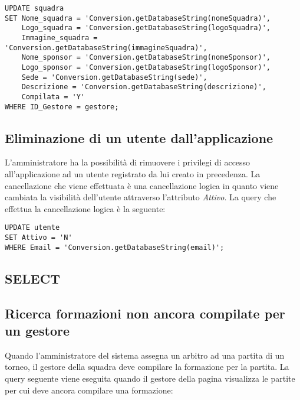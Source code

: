 \begin{lstlisting}
UPDATE squadra
SET Nome_squadra = 'Conversion.getDatabaseString(nomeSquadra)',
    Logo_squadra = 'Conversion.getDatabaseString(logoSquadra)',    
    Immagine_squadra = 'Conversion.getDatabaseString(immagineSquadra)',
    Nome_sponsor = 'Conversion.getDatabaseString(nomeSponsor)',
    Logo_sponsor = 'Conversion.getDatabaseString(logoSponsor)',
    Sede = 'Conversion.getDatabaseString(sede)',
    Descrizione = 'Conversion.getDatabaseString(descrizione)',
    Compilata = 'Y'
WHERE ID_Gestore = gestore;
\end{lstlisting}

\subsection*{Eliminazione di un utente dall'applicazione}
L'amministratore ha la possibilità di rimuovere i privilegi di accesso all'applicazione ad un utente registrato da lui creato in precedenza. La cancellazione che viene effettuata è una cancellazione logica in quanto viene cambiata la visibilità dell'utente attraverso l'attributo \emph{Attivo}.
La query che effettua la cancellazione logica è la seguente:

\begin{lstlisting}
UPDATE utente
SET Attivo = 'N'
WHERE Email = 'Conversion.getDatabaseString(email)';
\end{lstlisting}

\subsection{SELECT}

\subsection*{Ricerca formazioni non ancora compilate per un gestore}
Quando l'amministratore del sistema assegna un arbitro ad una partita di un torneo, il gestore della squadra deve compilare la formazione per la partita. La query seguente viene eseguita quando il gestore della pagina visualizza le partite per cui deve ancora compilare una formazione:

